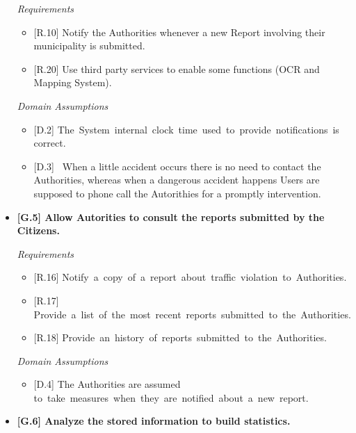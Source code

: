 \documentclass{report}
\begin{document}
\begin{itemize}
{\begin{itemize}
		\end{itemize}}
\begin{center}\large{\textit{Requirements}}\end{center}
    \begin{itemize}
		\item {[R.10]}
		Notify the Authorities whenever a new Report involving their municipality is submitted. 
		\item {[R.20]}
		Use third party services to enable some functions (OCR and Mapping System).
	\end{itemize}
\begin{center}\large{\textit{Domain Assumptions}}\end{center}
	\begin{itemize}
		\item {[D.2]} The System internal clock time used to provide notifications is correct.
		\item {[D.3]}
		 When a little accident occurs there is no need to contact the Authorities, whereas when a dangerous accident happens Users are supposed to phone call the Autorithies for a promptly intervention.
	\end{itemize}
	\vspace{3mm} 
	\item \textbf{{[G.5]} Allow Autorities to consult the reports submitted by the Citizens.}
\begin{center}\large{\textit{Requirements}}\end{center}
	\begin{itemize}
		\item {[R.16]} Notify a copy of a report about traffic violation to Authorities.
		\item {[R.17]} Provide a list of the most recent reports submitted to the Authorities.
    	\item {[R.18]} Provide an history of reports submitted to the Authorities.
	\end{itemize}
\begin{center}\large{\textit{Domain Assumptions}}\end{center}
	\begin{itemize}
		\item {[D.4]} The Authorities are assumed to take measures when they are notified about a new report.
	\end{itemize} 
	\vspace{3mm}
	\item \textbf{{[G.6]} Analyze the stored information to build statistics.
}
\end{itemize}
\end{document}
